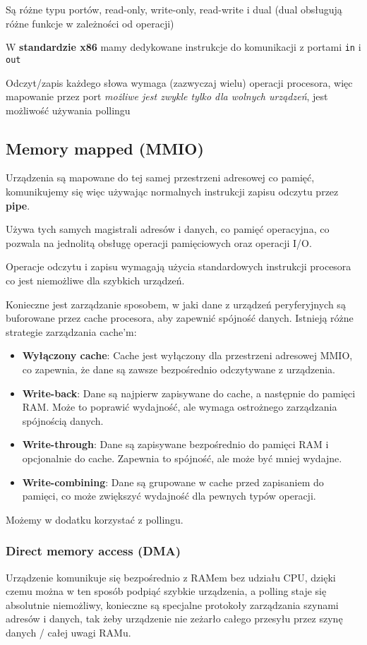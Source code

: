 Są różne typu portów, read-only, write-only, read-write i dual (dual obsługują różne funkcje w zależności od operacji)

W \textbf{standardzie x86} mamy dedykowane instrukcje do komunikacji z portami \texttt{in} i \texttt{out}

Odczyt/zapis każdego słowa wymaga (zazwyczaj wielu) operacji procesora, więc mapowanie przez port \textit{możliwe jest zwykle tylko dla wolnych urządzeń}, jest możliwość używania pollingu

\subsection{Memory mapped (MMIO)}
Urządzenia są mapowane do tej samej przestrzeni adresowej co pamięć, komunikujemy się więc używając normalnych instrukcji zapisu odczytu przez \textbf{pipe}.

Używa tych samych magistrali adresów i danych, co pamięć operacyjna, co pozwala na jednolitą obsługę operacji pamięciowych oraz operacji I/O.

Operacje odczytu i zapisu wymagają użycia standardowych instrukcji procesora co jest niemożliwe dla szybkich urządzeń.

Konieczne jest zarządzanie sposobem, w jaki dane z urządzeń peryferyjnych są buforowane przez cache procesora, aby zapewnić spójność danych. Istnieją różne strategie zarządzania cache'm:
\begin{itemize}
    \item \textbf{Wyłączony cache}: Cache jest wyłączony dla przestrzeni adresowej MMIO, co zapewnia, że dane są zawsze bezpośrednio odczytywane z urządzenia.
    \item \textbf{Write-back}: Dane są najpierw zapisywane do cache, a następnie do pamięci RAM. Może to poprawić wydajność, ale wymaga ostrożnego zarządzania spójnością danych.
    \item \textbf{Write-through}: Dane są zapisywane bezpośrednio do pamięci RAM i opcjonalnie do cache. Zapewnia to spójność, ale może być mniej wydajne.
    \item \textbf{Write-combining}: Dane są grupowane w cache przed zapisaniem do pamięci, co może zwiększyć wydajność dla pewnych typów operacji.
\end{itemize}

Możemy w dodatku korzystać z pollingu.

\subsubsection{Direct memory access (DMA)}
Urządzenie komunikuje się bezpośrednio z RAMem bez udziału CPU, dzięki czemu można w ten sposób podpiąć szybkie urządzenia, a polling staje się absolutnie niemożliwy, konieczne są specjalne protokoły zarządzania szynami adresów i danych, tak żeby urządzenie nie zeżarło całego przesyłu przez szynę danych / całej uwagi RAMu.

